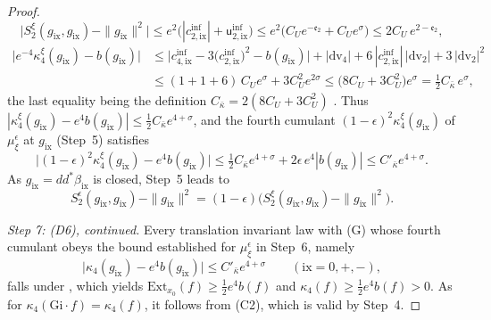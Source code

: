 \documentclass[11pt]{amsart}
\theoremstyle{definition}
\begin{document}
\begin{proof}
\begin{equation*}
\bigl|S_2^\xi(g_{\mathrm{ix}},g_{\mathrm{ix}})-\|g_{\mathrm{ix}}\|^2\bigr|\le e^2\bigl(|c^{\mathrm{inf}}_{2,\mathrm{ix}}|+\mathsf u^{\mathrm{inf}}_{2,\mathrm{ix}}\bigr)\le e^2\bigl(C_Ue^{-\mathfrak e_2}+C_Ue^\sigma\bigr)\le2C_U\,e^{2-\mathfrak e_2},
\end{equation*}
\begin{align*}
\bigl|e^{-4}\kappa_4^\xi(g_{\mathrm{ix}})-b(g_{\mathrm{ix}})\bigr|&\le\bigl|c^{\mathrm{inf}}_{4,\mathrm{ix}}-3\bigl(c^{\mathrm{inf}}_{2,\mathrm{ix}}\bigr)^2-b(g_{\mathrm{ix}})\bigr|+|\mathrm{dv}_4|+6\,|c^{\mathrm{inf}}_{2,\mathrm{ix}}|\,|\mathrm{dv}_2|+3\,|\mathrm{dv}_2|^2\\
&\le(1+1+6)\,C_Ue^\sigma+3C_U^2e^{2\sigma}\le\bigl(8C_U+3C_U^2\bigr)e^\sigma=\tfrac12C_{\bar\kappa}\,e^\sigma,
\end{align*}
the last equality being the definition $C_{\bar\kappa}=2(8C_U+3C_U^2)$ \cite[Proposition~43.2, Constants]{QEDIII}.
Thus $|\kappa_4^\xi(g_{\mathrm{ix}})-e^4b(g_{\mathrm{ix}})|\le\frac12C_{\bar\kappa}e^{4+\sigma}$, and the fourth cumulant $(1-\epsilon)^2\kappa_4^\xi(g_{\mathrm{ix}})$ of $\mu_\xi^\epsilon$ at $g_{\mathrm{ix}}$ (Step~5) satisfies
\begin{equation*}
\bigl|(1-\epsilon)^2\kappa_4^\xi(g_{\mathrm{ix}})-e^4b(g_{\mathrm{ix}})\bigr|\le\tfrac12C_{\bar\kappa}e^{4+\sigma}+2\epsilon\,e^4|b(g_{\mathrm{ix}})|\le C'_{\bar\kappa}e^{4+\sigma}.
\end{equation*}
As $g_{\mathrm{ix}}=dd^*\beta_{\mathrm{ix}}$ is closed, Step~5 leads to
\begin{equation*}
S_2^\epsilon(g_{\mathrm{ix}},g_{\mathrm{ix}})-\|g_{\mathrm{ix}}\|^2=(1-\epsilon)\bigl(S_2^\xi(g_{\mathrm{ix}},g_{\mathrm{ix}})-\|g_{\mathrm{ix}}\|^2\bigr).
\end{equation*}

\emph{Step 7: (D6), continued.}
Every translation invariant law with (G) whose fourth cumulant obeys the bound established for $\mu_\xi^\epsilon$ in Step~6, namely
\begin{equation*}
\bigl|\kappa_4(g_{\mathrm{ix}})-e^4b(g_{\mathrm{ix}})\bigr|\le C'_{\bar\kappa}e^{4+\sigma}\qquad(\mathrm{ix}=0,+,-),
\end{equation*}
falls under \cite[Chapter~44, Lemma~3.2]{QEDIII}, which yields $\mathrm{Ext}_{x_0}(f)\ge\frac12e^4b(f)$ and $\kappa_4(f)\ge\frac12e^4b(f)>0$.
As for $\kappa_4(\mathrm{Gi}\cdot f)=\kappa_4(f)$, it follows from (C2), which is valid by Step~4.


\end{proof}
\end{document}
